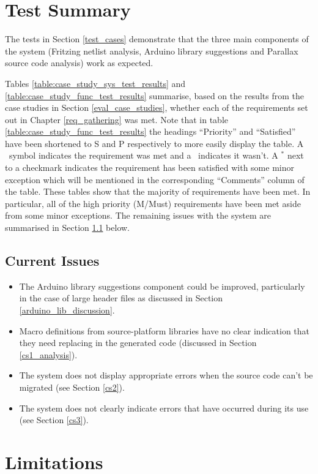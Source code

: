 \documentclass{UoYCSproject}
\newcommand{\xmark}{\ding{55}}%
\renewcommand{\checkmark}{\ding{51}}
\begin{document}
\section{Test Summary} \label{test_summary}
The tests in Section \ref{test_cases} demonstrate that the three main components of the system (Fritzing netlist analysis, Arduino library suggestions and Parallax source code analysis) work as expected.

Tables \ref{table:case_study_sys_test_results} and \ref{table:case_study_func_test_results} summarise, based on the results from the case studies in Section \ref{eval_case_studies}, whether each of the requirements set out in Chapter \ref{req_gathering} was met. Note that in table \ref{table:case_study_func_test_results} the headings ``Priority'' and ``Satisfied'' have been shortened to S and P respectively to more easily display the table. A \checkmark \ symbol indicates the requirement was met and a \xmark \ indicates it wasn't. A $^*$ next to a checkmark indicates the requirement has been satisfied with some minor exception which will be mentioned in the corresponding ``Comments'' column of the table.
These tables show that the majority of requirements have been met. In particular, all of the high priority (M/Must) requirements have been met aside from some minor exceptions. The remaining issues with the system are summarised in Section \ref{current_issues} below.

\subsection{Current Issues} \label{current_issues}
\begin{itemize}
\item The Arduino library suggestions component could be improved, particularly in the case of large header files as discussed in Section \ref{arduino_lib_discussion}.
\item Macro definitions from source-platform libraries have no clear indication that they need replacing in the generated code (discussed in Section \ref{cs1_analysis}).
\item The system does not display appropriate errors when the source code can't be migrated (see Section \ref{cs2}).
\item The system does not clearly indicate errors that have occurred during its use (see Section \ref{cs3}).
\end{itemize}

\section{Limitations} \label{eval_limits}
\end{document}
